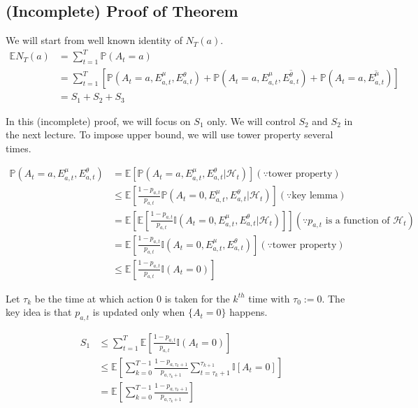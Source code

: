 \documentclass[11pt]{article}
\begin{document}
\subsection{(Incomplete) Proof of Theorem}
We will start from well known identity of $N_T(a)$. 
\begin{align*}
    \mathbb{E}N_T(a) &= \sum_{t=1}^T \mathbb{P}(A_t = a) \\
    &= \sum_{t=1}^T [\mathbb{P}(A_t = a, E^\mu_{a, t}, E^\theta_{a, t}) + \mathbb{P}(A_t = a, E^\mu_{a, t}, \overline{E^\theta_{a, t}}) + \mathbb{P}(A_t = a, \overline{E^\mu_{a, t}})] \\
    &= S_1 + S_2 + S_3
\end{align*}

In this (incomplete) proof, we will focus on $S_1$ only. We will control $S_2
$ and $S_2$ in the next lecture. To impose upper bound, we will use tower property several times. 

\begin{align*}
    \mathbb{P}(A_t = a, E^\mu_{a, t}, E^\theta_{a, t}) &= \mathbb{E}[\mathbb{P}(A_t = a, E^\mu_{a, t}, E^\theta_{a, t}|\mathcal{H}_t)] (\because \text{tower property})\\
    &\leq \mathbb{E}[\frac{1 - p_{a, t}}{p_{a, t}}\mathbb{P}(A_t = 0, E^\mu_{a, t}, E^\theta_{a, t}|\mathcal{H}_t)] (\because \text{key lemma}) \\
    &= \mathbb{E}[\mathbb{E}[\frac{1 - p_{a, t}}{p_{a, t}}\mathbb{I}(A_t = 0, E^\mu_{a, t}, E^\theta_{a, t}|\mathcal{H}_t)]] (\because p_{a,t} \text{ is a function of } \mathcal{H}_t) \\
    &= \mathbb{E}[\frac{1 - p_{a, t}}{p_{a, t}}\mathbb{I}(A_t = 0, E^\mu_{a, t}, E^\theta_{a, t})] (\because \text{tower property})\\
    &\leq \mathbb{E}[\frac{1 - p_{a, t}}{p_{a, t}}\mathbb{I}(A_t = 0)]
\end{align*}

Let $\tau_k$ be the time at which action $0$ is taken for the $k^{th}$ time with $\tau_0 :=0$. The key idea is that $p_{a, t}$ is updated only when $\{A_t = 0\}$ happens. 

\begin{align*}
    S_1 &\leq \sum_{t=1}^T\mathbb{E}[\frac{1 - p_{a, t}}{p_{a, t}}\mathbb{I}(A_t = 0)] \\
    &\leq \mathbb{E}[\sum_{k=0}^{T-1} \frac{1 - p_{a, \tau_k + 1}}{p_{a, \tau_k +1}}\sum_{t=\tau_k +1}^{\tau_{k+1}}\mathbb{I}[A_t = 0]] \\
    &=\mathbb{E}[\sum_{k=0}^{T-1} \frac{1 - p_{a, \tau_k + 1}}{p_{a, \tau_k +1}}]
\end{align*}
\end{document}
